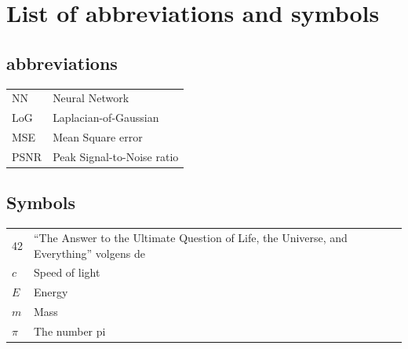 \documentclass[master=ewtk]{kulemt}
\begin{document}
\chapter{List of abbreviations and symbols}
\section*{abbreviations}
\begin{flushleft}
  \renewcommand{\arraystretch}{1.1}
  \begin{tabularx}{\textwidth}{@{}p{12mm}X@{}}
  	NN  & Neural Network \\
    LoG   & Laplacian-of-Gaussian \\
    MSE   & Mean Square error \\
    PSNR  & Peak Signal-to-Noise ratio \\
    
  \end{tabularx}
\end{flushleft}
\section*{Symbols}
\begin{flushleft}
  \renewcommand{\arraystretch}{1.1}
  \begin{tabularx}{\textwidth}{@{}p{12mm}X@{}}
    42    & ``The Answer to the Ultimate Question of Life, the Universe,
            and Everything'' volgens de \cite{h2g2} \\
    $c$   & Speed of light \\
    $E$   & Energy \\
    $m$   & Mass \\
    $\pi$ & The number pi \\
  \end{tabularx}
\end{flushleft}

\mainmatter








\appendixpage*          %
\appendix


\backmatter



\end{document}

